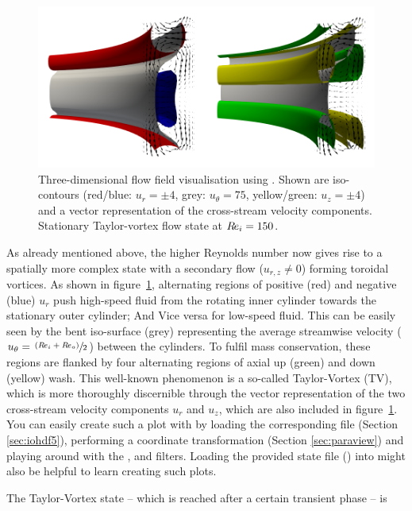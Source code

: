 \documentclass[a4paper, 11pt, DIV=11]{scrartcl}
\begin{document}
\begin{figure}
\includegraphics[width=1.00\textwidth]{figures/tc0041/vectorPlot.png}
\caption{Three-dimensional flow field visualisation using  \paraview.
Shown are iso-contours (red/blue: $u_{r}=\pm\num{4}$, grey:
$u_{\theta}=\num{75}$, yellow/green: $u_{z}=\pm\num{4}$) and a vector
representation of the cross-stream velocity components. Stationary
Taylor-vortex flow state at $R\hspace{-0.1em}e_{i}=\num{150}$.}
\label{fig:tc0041vectorPlot}
\end{figure}
As already mentioned above, the higher Reynolds number now gives rise
to a spatially more complex state with a secondary flow ($u_{r,z}\neq\num{0}$)
forming toroidal vortices. As shown in figure~\ref{fig:tc0041vectorPlot},
alternating regions of positive (red) and negative (blue) $u_r$ push high-speed
fluid from the rotating inner cylinder towards the stationary outer cylinder;
And Vice versa for low-speed fluid. This can be easily seen by the bent
iso-surface (grey) representing the average streamwise velocity 
($u_{\theta}=\sfrac{\left(R\hspace{-0.1em}e_{i}+R\hspace{-0.1em}e_{o}\right)}{2}$) between the cylinders.
To fulfil mass conservation, these regions are flanked by four alternating regions of
axial up (green) and down (yellow) wash. This well-known phenomenon is a so-called
Taylor-Vortex (TV), which is more thoroughly discernible through the vector representation
of the two cross-stream velocity components $u_{r}$ and $u_{z}$, which are also included
in figure~\ref{fig:tc0041vectorPlot}. You can easily create such a plot with \paraview
by loading the corresponding  file (Section \ref{sec:iohdf5}), performing a
coordinate transformation (Section \ref{sec:paraview}) and playing around with the
,  and  filters. Loading the provided state file 
() into \paraview might also be helpful to
learn creating such plots.
\par
The Taylor-Vortex state -- which is reached after a certain transient phase -- is
\end{document}
